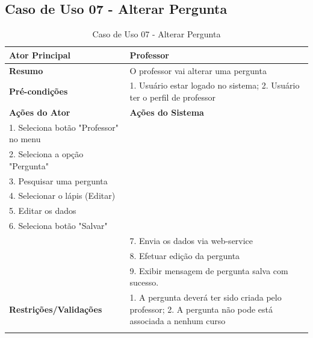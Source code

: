 \subsection{Caso de Uso 07 - Alterar Pergunta}
\label{sc:case7}
\begin{center}
\begin{longtable}{p{8cm}|p{8cm}}
    \hline
    \textbf{Ator Principal} & Professor \\
    \hline
    \textbf{Resumo} & O professor vai alterar uma pergunta \\
    \hline
    \textbf{Pr\'{e}-condi\c{c}\~{o}es} & 1. Usuário estar logado no sistema; 2. Usuário ter o perfil de professor \\
    \hline
    \textbf{A\c{c}\~{o}es do Ator} & \textbf{A\c{c}\~{o}es do Sistema} \\
    \hline
    1. Seleciona botão "Professor" no menu \\
    \hline
    2. Seleciona a opção "Pergunta" \\
	\hline
    3. Pesquisar uma pergunta \\
	\hline
    4. Selecionar o lápis (Editar) \\
	\hline
    5. Editar os dados \\
	\hline
    6. Seleciona botão "Salvar" \\
    \hline
    & 7. Envia os dados via web-service \\
	\hline
    & 8. Efetuar edição da pergunta \\
	\hline
    & 9. Exibir mensagem de pergunta salva com sucesso. \\
    \hline
    \hline
    \textbf{Restri\c{c}\~{o}es/Valida\c{c}\~{o}es} & 1. A pergunta deverá ter sido criada pelo professor; 2. A pergunta não pode está associada a nenhum curso \\
\hline
\caption{Caso de Uso 07 - Alterar Pergunta}
\end{longtable}
\end{center}

